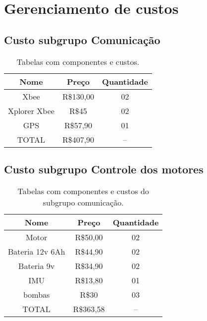 \chapter[Gerenciamento de custos]{Gerenciamento de custos}

\section{Custo subgrupo Comunicação}

\begin{table}[h]
	\centering
	\label{Custosubgrupocomunicação}	
	\begin{tabular}{ccc}
		\toprule
		\textbf{Nome} & \textbf{Preço} & \textbf{Quantidade} \\
		\midrule
		Xbee & R\$130,00 & 02          \\
		Xplorer Xbee & R\$45 & 02          \\
		GPS & R\$57,90 & 01             \\
		TOTAL & R\$407,90 &-- \\
		\bottomrule
	\end{tabular}	
	\caption{Tabelas com componentes e custos.}
\end{table}
\section{Custo subgrupo Controle dos motores}
\begin{table}[h]
	\centering
	\label{Custosubgrupocontroledosmotores}	
	\begin{tabular}{ccc}
		\toprule
		\textbf{Nome} & \textbf{Preço} & \textbf{Quantidade} \\
		\midrule
		Motor & R\$50,00 & 02          \\
		Bateria 12v 6Ah & R\$44,90 & 02             \\
		Bateria 9v & R\$34,90 & 02             \\
	    IMU & R\$13,80 & 01             \\
	    bombas & R\$30 & 03             \\
	     TOTAL & R\$363,58 &--            \\
		\bottomrule
	\end{tabular}	
	\caption{Tabelas com componentes e custos do subgrupo comunicação.}
\end{table}
